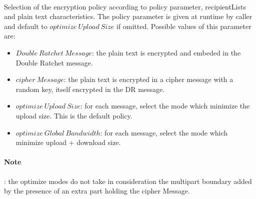 \documentclass[a4paper,11pt]{article}
\begin{document}
      \paragraph*{}Selection of the encryption policy according to policy parameter, recipientLists and plain text characteristics. The policy parameter is given at runtime by caller and default to $optimize\ Upload\ Size$ if omitted. Possible values of this parameter are:
        \begin{itemize}
          \item $Double\ Ratchet\ Message$: the plain text is encrypted and embeded in the Double Ratchet message.
          \item $cipher\ Message$: the plain text is encrypted in a cipher message with a random key, itself encrypted in the DR message.
          \item $optimize\ Upload\ Size$: for each message, select the mode which minimize the upload size. This is the default policy.
          \item $optimize\ Global\ Bandwidth$: for each message, select the mode which minimize upload + download size.
        \end{itemize}
        \paragraph*{Note}: the optimize modes do not take in consideration the multipart boundary added by the presence of an extra part holding the cipher Message.
        \label{messageEncrypt}
\end{document}
